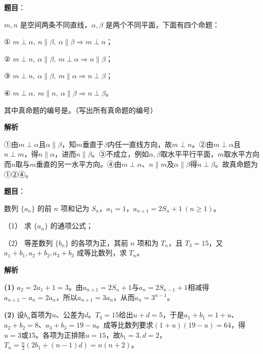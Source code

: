 \begin{answer}

\textbf{题目}：

$m,n$ 是空间两条不同直线，$\alpha,\beta$ 是两个不同平面，下面有四个命题：

① $m\perp\alpha,\ n\parallel\beta,\ \alpha\parallel\beta\Rightarrow m\perp n$；

② $m\perp n,\ \alpha\parallel\beta,\ m\perp\alpha\Rightarrow n\parallel\beta$；

③ $m\perp n,\ \alpha\parallel\beta,\ m\parallel\alpha\Rightarrow n\perp\beta$；

④ $m\perp\alpha,\ m\parallel n,\ \alpha\parallel\beta\Rightarrow n\perp\beta$。

其中真命题的编号是\gkblank{}。（写出所有真命题的编号）

\textbf{解析}

①由$m\perp\alpha$且$\alpha\parallel\beta$，知$m$垂直于$\beta$内任一直线方向，故$m\perp n$。②由$m\perp\alpha$且$n\perp m$，得$n\parallel\alpha$，进而$n\parallel\beta$。③不成立，例如$\alpha,\beta$取水平平行平面，$m$取水平方向而$n$取与$m$垂直的另一水平方向。④由$m\perp\alpha$、$n\parallel m$及$\alpha\parallel\beta$得$n\perp\beta$。故真命题为①②④。


\end{answer}
\begin{answer}

\textbf{题目}：

数列 $\{a_n\}$ 的前 $n$ 项和记为 $S_n$，$a_1=1$，$a_{n+1}=2S_n+1\ (n\geqslant1)$。

（1） 求 $\{a_n\}$ 的通项公式；

（2） 等差数列 $\{b_n\}$ 的各项为正，其前 $n$ 项和为 $T_n$，且 $T_3=15$，又 $a_1+b_1,a_2+b_2,a_3+b_3$ 成等比数列，求 $T_n$。

\textbf{解析}

\textbf{(1)} $a_2=2a_1+1=3$。由$a_{n+1}=2S_n+1$与$a_n=2S_{n-1}+1$相减得$a_{n+1}-a_n=2a_n$，所以$a_{n+1}=3a_n$，从而$a_n=3^{n-1}$。

\textbf{(2)} 设$b_n$首项为$u$、公差为$d$。$T_3=15$给出$u+d=5$，于是$a_1+b_1=1+u$、$a_2+b_2=8$、$a_3+b_3=19-u$。成等比数列要求$(1+u)(19-u)=64$，得$u=3$或15。各项为正排除$u=15$，故$b_1=3,d=2$，$T_n=\frac n2(2b_1+(n-1)d)=n(n+2)$。



\end{answer}

